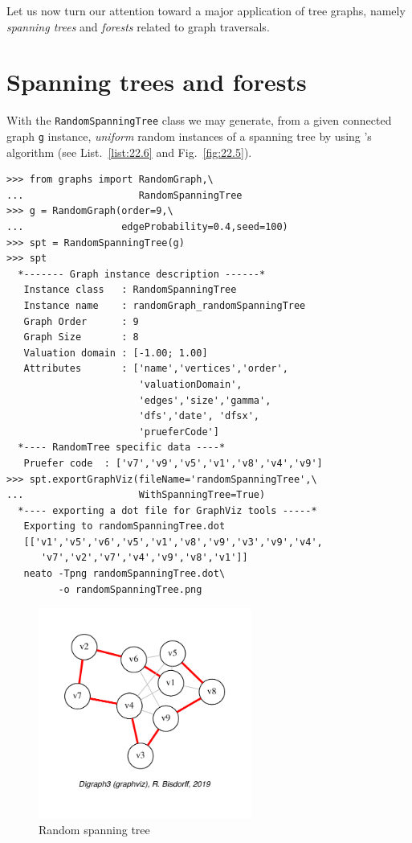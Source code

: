 Let us now turn our attention toward a major application of tree graphs, namely \emph{spanning trees} and \emph{forests} related to graph traversals.

\section{Spanning trees and forests}
\label{sec:22.2}

With the \texttt{RandomSpanningTree} class we may generate, from a given connected graph \texttt{g} instance, \emph{uniform} random instances of a spanning tree by using \Wilson's algorithm (see List.~\vref{list:22.6} and Fig.~\vref{fig:22.5}).
\begin{lstlisting}[caption={Generating uniform random spanning trees.},label=list:22.6]
>>> from graphs import RandomGraph,\
...                    RandomSpanningTree
>>> g = RandomGraph(order=9,\
...                 edgeProbability=0.4,seed=100)
>>> spt = RandomSpanningTree(g)
>>> spt
  *------- Graph instance description ------*
   Instance class   : RandomSpanningTree
   Instance name    : randomGraph_randomSpanningTree
   Graph Order      : 9
   Graph Size       : 8
   Valuation domain : [-1.00; 1.00]
   Attributes       : ['name','vertices','order',
                       'valuationDomain',
                       'edges','size','gamma',
                       'dfs','date', 'dfsx',
                       'prueferCode']
  *---- RandomTree specific data ----*
   Pruefer code  : ['v7','v9','v5','v1','v8','v4','v9']
>>> spt.exportGraphViz(fileName='randomSpanningTree',\
...                    WithSpanningTree=True)
  *---- exporting a dot file for GraphViz tools -----*
   Exporting to randomSpanningTree.dot
   [['v1','v5','v6','v5','v1','v8','v9','v3','v9','v4',
      'v7','v2','v7','v4','v9','v8','v1']]
   neato -Tpng randomSpanningTree.dot\
         -o randomSpanningTree.png
\end{lstlisting}
\begin{figure}[ht]
\sidecaption[t]
\includegraphics[width=7cm]{Figures/22-5-randomSpanningTree.pdf}
\caption{Random spanning tree} 
\label{fig:22.5}       %
\end{figure}

